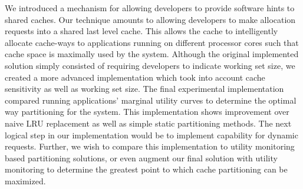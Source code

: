 \documentclass{acm_proc_article-sp}
\begin{document}
We introduced a mechanism for allowing developers to provide software hints to shared caches. Our technique amounts to allowing developers to make allocation requests into a shared last level cache. This allows the cache to intelligently allocate cache-ways to applications running on different processor cores such that cache space is maximally used by the system. Although the original implemented solution simply consisted of requiring developers to indicate working set size, we created a more advanced implementation which took into account cache sensitivity as well as working set size. The final experimental implementation compared running applications' marginal utility curves to determine the optimal way partitioning for the system. This implementation shows improvement over naive LRU replacement as well as simple static partitioning methods. The next logical step in our implementation would be to implement capability for dynamic requests. Further, we wish to compare this implementation to utility monitoring based partitioning solutions, or even augment our final solution with utility monitoring to determine the greatest point to which cache partitioning can be maximized.




\end{document}
